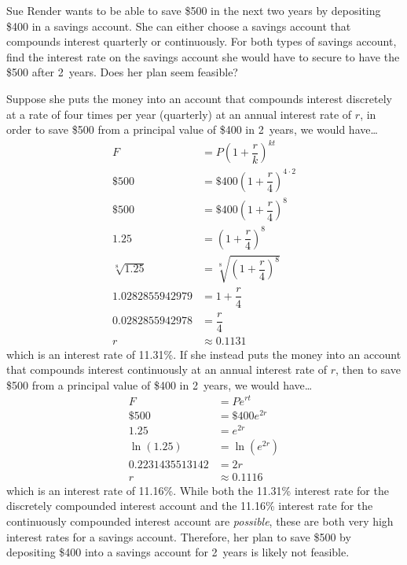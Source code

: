 \documentclass[11pt,letterpaper]{article}
\begin{document}
\newpage



 Sue Render wants to be able to save \$500 in the next two years by depositing \$400 in a savings account. She can either choose a savings account that compounds interest quarterly or continuously. For both types of savings account, find the interest rate on the savings account she would have to secure to have the \$500 after 2~years. Does her plan seem feasible? \pspace

\sol Suppose she puts the money into an account that compounds interest discretely at a rate of four times per year (quarterly) at an annual interest rate of $r$, in order to save \$500 from a principal value of \$400 in 2~years, we would have\dots
	\[
	\begin{aligned}
	F&= P \left(1 + \dfrac{r}{k} \right)^{kt} \\[0.3cm]
	\$500&= \$400 \left(1 + \dfrac{r}{4} \right)^{4 \cdot 2} \\[0.3cm]
	\$500&= \$400 \left(1 + \dfrac{r}{4} \right)^8 \\[0.3cm] 
	1.25&= \left(1 + \dfrac{r}{4} \right)^8 \\[0.3cm]
	\sqrt[8]{1.25}&= \sqrt[8]{\left(1 + \dfrac{r}{4} \right)^8} \\[0.3cm] 
	1.0282855942979&= 1 + \dfrac{r}{4} \\[0.3cm]
	0.0282855942978&= \dfrac{r}{4} \\[0.3cm]
	r&\approx 0.1131
	\end{aligned}
	\]
which is an interest rate of 11.31\%. If she instead puts the money into an account that compounds interest continuously at an annual interest rate of $r$, then to save \$500 from a principal value of \$400 in 2~years, we would have\dots 
	\[
	\begin{aligned}
	F&= Pe^{rt} \\[0.3cm]
	\$500&= \$400 e^{2r} \\[0.3cm]
	1.25&= e^{2r} \\[0.3cm]
	\ln(1.25)&= \ln(e^{2r}) \\[0.3cm]
	0.2231435513142&= 2r \\[0.3cm]
	r&\approx 0.1116
	\end{aligned}
	\]
which is an interest rate of 11.16\%. While both the 11.31\% interest rate for the discretely compounded interest account and the 11.16\% interest rate for the continuously compounded interest account are \textit{possible}, these are both very high interest rates for a savings account. Therefore, her plan to save \$500 by depositing \$400 into a savings account for 2~years is likely not feasible. 
\end{document}
